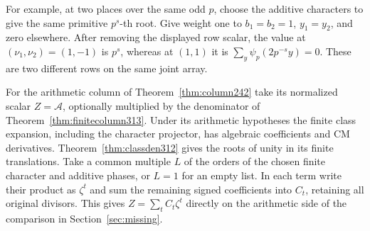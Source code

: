 \documentclass[a4paper,11pt]{article}
\theoremstyle{definition}
\theoremstyle{remark}
\numberwithin{equation}{section}
\begin{document}
For example, at two places over the same odd \(p\), choose the
additive characters to give the same primitive \(p^s\)-th root.
Give weight one to \(b_1=b_2=1\), \(y_1=y_2\), and zero elsewhere.
After removing the displayed row scalar, the value at
\((\nu_1,\nu_2)=(1,-1)\) is \(p^s\), whereas at \((1,1)\) it is
\(\sum_y\psi_p(2p^{-s}y)=0\). These are two different rows on the
same joint array.

For the arithmetic column of Theorem~\ref{thm:column242} take its
normalized scalar \(Z=\mathcal A\), optionally multiplied by the
denominator of Theorem~\ref{thm:finitecolumn313}. Under its
arithmetic hypotheses the finite class expansion, including the
character projector, has algebraic coefficients and CM derivatives.
Theorem~\ref{thm:classden312} gives the roots of unity in its
finite translations. Take a common multiple \(L\) of the orders of
the chosen finite character and additive phases, or \(L=1\) for an
empty list. In each term write their product as \(\zeta^t\) and sum
the remaining signed coefficients into \(C_t\), retaining all original
divisors. This gives \(Z=\sum_t C_t\zeta^t\) directly on the arithmetic
side of the comparison in Section~\ref{sec:missing}.
\end{document}
